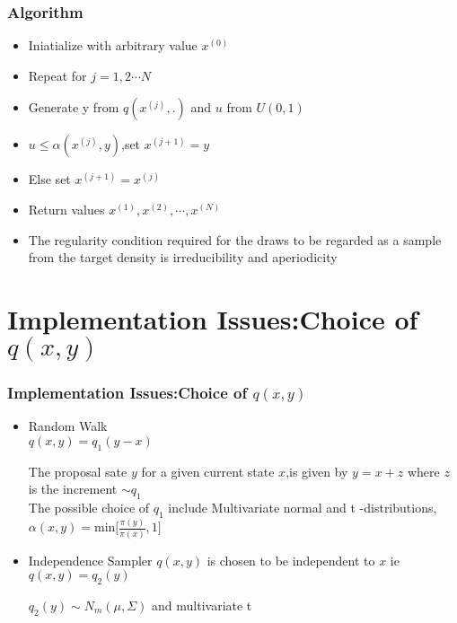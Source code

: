 \documentclass[hyperref={pdfpagelabels=false}]{beamer}
\begin{document}
\begin{frame}
\frametitle{Algorithm}
\begin{itemize}
\pause
\item Iniatialize with arbitrary value $x^{(0)}$
\pause
\item Repeat for $j=1,2\cdots N$
\pause
\item Generate y from $q(x^{(j)},.)$ and $u$ from $U(0,1)$

\pause
\item $u\leq \alpha(x^{(j)},y)$,set $x^{(j+1)}=y$ 
\item Else set $x^{(j+1)}=x^{(j)}$ 
\pause
\item Return values ${x^{(1)},x^{(2)},\cdots,x^{(N)}}$
\vspace{5mm}
\item The regularity condition required for the draws to be regarded as a sample from the target density is irreducibility and aperiodicity
\end{itemize}
\end{frame}


\section{Implementation Issues:Choice of $q(x,y)$}

\begin{frame}
\frametitle{Implementation Issues:Choice of $q(x,y)$}
\begin{itemize}
\item Random Walk\\
$q(x,y)=q_{1}(y-x)$

The proposal sate $y$ for a given current state $x$,is given by $y=x+z$ where $z$ is the increment  $\sim q_{1}$\\
The possible choice of $q_{1}$  include Multivariate normal and t -distributions,
$\alpha(x,y)=\textrm{min}\Bigg[\frac{\pi(y)}{\pi(x)},1\Bigg] $

\pause
\item Independence Sampler
$q(x,y)$ is chosen to be independent to $x$ ie $q(x,y)=q_{2}(y)$

$q_{2}(y) \sim  N_{m}(\mu,\Sigma)$ and multivariate t

\end{itemize}

\end{frame}
\end{document}
